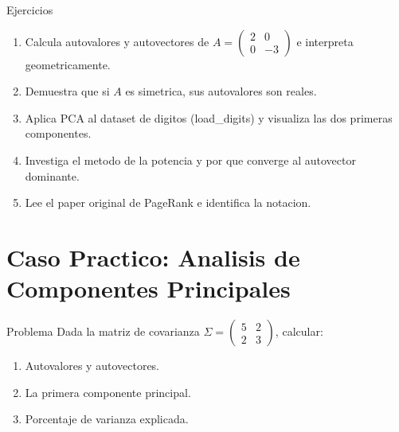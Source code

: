 \documentclass[aspectratio=169, 10pt, xcolor=table]{beamer}
\begin{document}
\begin{frame}{Ejercicios}
    \begin{enumerate}
        \item Calcula autovalores y autovectores de $A = \begin{pmatrix}2&0\\0&-3\end{pmatrix}$ e interpreta geometricamente.
        \item Demuestra que si $A$ es simetrica, sus autovalores son reales.
        \item Aplica PCA al dataset de digitos (load\_digits) y visualiza las dos primeras componentes.
        \item Investiga el metodo de la potencia y por que converge al autovector dominante.
        \item Lee el paper original de PageRank e identifica la notacion.
    \end{enumerate}
\end{frame}

\section{Caso Practico: Analisis de Componentes Principales}

\begin{frame}{Problema}
    Dada la matriz de covarianza $\Sigma = \begin{pmatrix}5&2\\2&3\end{pmatrix}$, calcular:
    \begin{enumerate}
        \item Autovalores y autovectores.
        \item La primera componente principal.
        \item Porcentaje de varianza explicada.
    \end{enumerate}
\end{frame}
\end{document}
